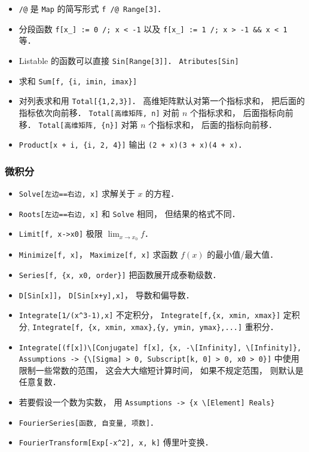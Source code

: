 \begin{itemize}
\item \verb|/@| 是 \verb|Map| 的简写形式 \verb|f /@ Range[3]|．
\item 分段函数 \verb|f[x_] := 0 /; x < -1| 以及 \verb|f[x_] := 1 /; x > -1 && x < 1| 等．
\item Listable 的函数可以直接 \verb|Sin[Range[3]]|． \verb|Atributes[Sin]|
\item 求和 \verb|Sum[f, {i, imin, imax}]|
\item 对列表求和用 \verb|Total[{1,2,3}]|． 高维矩阵默认对第一个指标求和， 把后面的指标依次向前移． \verb|Total[高维矩阵, n]| 对前 $n$ 个指标求和， 后面指标向前移． \verb|Total[高维矩阵, {n}]| 对第 $n$ 个指标求和， 后面的指标向前移．
\item \verb|Product[x + i, {i, 2, 4}]| 输出 \verb|(2 + x)(3 + x)(4 + x)|．
\end{itemize}

\subsubsection{微积分}
\begin{itemize}
\item \verb|Solve[左边==右边, x]| 求解关于 $x$ 的方程．
\item \verb|Roots[左边==右边, x]| 和 \verb|Solve| 相同， 但结果的格式不同．
\item \verb|Limit[f, x->x0]| 极限 $\lim_{x\to x_0} f$．
\item \verb|Minimize[f, x]|， \verb|Maximize[f, x]| 求函数 $f(x)$ 的最小值/最大值．
\item \verb|Series[f, {x, x0, order}]| 把函数展开成泰勒级数．
\item \verb|D[Sin[x]]|， \verb|D[Sin[x+y],x]|， 导数和偏导数．
\item \verb|Integrate[1/(x^3-1),x]| 不定积分， \verb|Integrate[f,{x, xmin, xmax}]| 定积分, \verb|Integrate[f, {x, xmin, xmax},{y, ymin, ymax},...]| 重积分．
\item \verb|Integrate[(f[x])\[Conjugate] f[x], {x, -\[Infinity], \[Infinity]}, Assumptions -> {\[Sigma] > 0, Subscript[k, 0] > 0, x0 > 0}]| 中使用限制一些常数的范围， 这会大大缩短计算时间， 如果不规定范围， 则默认是任意复数．
\item 若要假设一个数为实数， 用 \verb|Assumptions -> {x \[Element] Reals}|
\item \verb|FourierSeries[函数, 自变量, 项数]|．
\item \verb|FourierTransform[Exp[-x^2], x, k]| 傅里叶变换．
\end{itemize}

